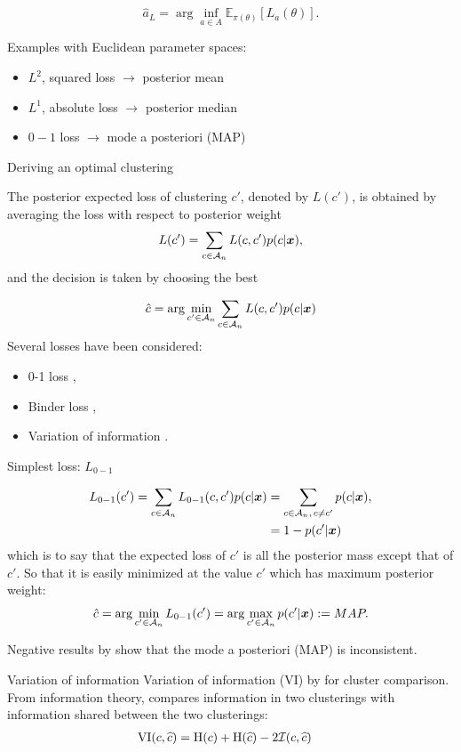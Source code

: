 \begin{equation*}
\hat{a}_L = \arg \inf_{a \in A} \mathbb{E}_{\pi(\theta)}[L_a(\theta)].
\end{equation*}

Examples with Euclidean parameter spaces:
\begin{itemize}
	\item $L^2$, squared loss $\longrightarrow$ posterior mean
	\item $L^1$, absolute loss $\longrightarrow$ posterior median
	\item $0-1$ loss  $\longrightarrow$ mode a posteriori (MAP)
\end{itemize}


{Deriving an optimal clustering}

The posterior expected loss of clustering $c'$, denoted by $L(c')$, is obtained by \alert{averaging the loss with respect to posterior weight}
$$L(c') = \sum_{c\in\mathcal{A}_n} L(c,c')p(c|\boldsymbol{x}),$$
and the decision is taken by choosing the best

\begin{equation*}
\hat c = \arg \min_{c' \in \mathcal{A}_n} \sum_{c\in\mathcal{A}_n} L(c,c')p(c|\boldsymbol{x})
\end{equation*}
Several losses have been considered:
	\begin{itemize}
		\item 0-1 loss \citep{rajkowski2019analysis},
		\item Binder loss \citep{dahl2006model},
		\item Variation of information \citep{wade2018bayesian}.
	\end{itemize}


{Simplest loss: $L_{0-1}$}

\begin{align*}
	L_{0-1}(c') = \sum_{c\in\mathcal{A}_n} L_{0-1}(c,c')p(c|\boldsymbol{x}) &= \sum_{c\in\mathcal{A}_n,\,c\neq c'} p(c|\boldsymbol{x}),\\
	& = 1 - p(c'|\boldsymbol{x})
\end{align*}
which is to say that the expected loss of $c'$ is \alert{all the posterior mass except that of $c'$.} So that it is easily minimized at the value $c'$ which has \alert{maximum} posterior weight:
$$\hat c =  \arg \min_{c' \in \mathcal{A}_n} L_{0-1}(c') =   \arg \max_{c' \in \mathcal{A}_n} p(c'|\boldsymbol{x}):= MAP.$$

Negative results by \citet{rajkowski2019analysis} show that the \alert{mode a posteriori (MAP) is inconsistent}.
	


{Variation of information}
\alert{Variation of information} (VI) by \citet{meila2007comparing} for cluster comparison. From information theory, compares information in two clusterings with information shared between the two clusterings:
\begin{align*}
&\text{VI}(c,\widehat{c})=\text{H}(c)+\text{H}(\widehat{c})-2\mathcal{I}(c,\widehat{c})
\end{align*}



